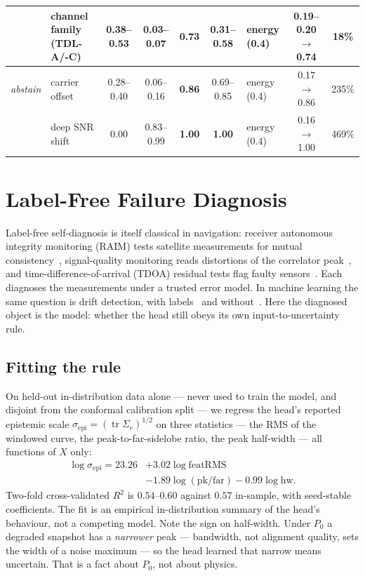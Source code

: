 \documentclass{article}
\begin{document}
\begin{table}[t]
\begin{tabular}{@{}clcccc|lcc@{}}
& channel family (TDL-A/-C)     & 0.38--0.53 & 0.03--0.07 & \textbf{0.73} & 0.31--0.58 & \textbf{energy} (0.4) & 0.19--0.20 $\to$ \textbf{0.74} & 18\% \\
\midrule
{\itshape abstain} & carrier offset                & 0.28--0.40 & 0.06--0.16 & \textbf{0.86} & 0.69--0.85 & energy (0.4) & 0.17 $\to$ 0.86 & 235\% \\
& deep SNR shift                & 0.00 & 0.83--0.99 & \textbf{1.00} & \textbf{1.00} & energy (0.4) & 0.16 $\to$ 1.00 & 469\% \\
\bottomrule
\end{tabular}
\end{table}

\section{Label-Free Failure Diagnosis}
\label{sec:diag}

Label-free self-diagnosis is itself classical in navigation: receiver
autonomous integrity monitoring (RAIM) tests satellite measurements for mutual consistency~\cite{brown1992},
signal-quality monitoring reads distortions of the correlator
peak~\cite{phelts2001}, and time-difference-of-arrival (TDOA) residual tests flag faulty
sensors~\cite{giunta2023}. Each diagnoses the measurements under a trusted
error model. In machine learning the same question is
drift detection, with labels~\cite{bayram2022} and without~\cite{oikarinen2021}. Here the diagnosed object is the model: whether the head
still obeys its own input-to-uncertainty rule.

\subsection{Fitting the rule}
\label{sec:fit}
On held-out in-distribution data alone --- never used to train the model,
and disjoint from the conformal calibration split --- we regress the head's
reported epistemic scale
$\sigma_{\mathrm{epi}}=(\operatorname{tr}\Sigma_e)^{1/2}$ on three statistics --- the RMS of the windowed
curve, the peak-to-far-sidelobe ratio, the peak half-width --- all
functions of $X$ only:
\begin{align}
\log\sigma_{\mathrm{epi}} = 23.26 &+ 3.02\log \mathrm{featRMS} \nonumber\\[-3pt]
 &- 1.89\log \mathrm{(pk/far)} - 0.99\log \mathrm{hw}.
\label{eq:rule}
\end{align}
Two-fold cross-validated $R^2$ is $0.54$--$0.60$ against $0.57$ in-sample,
with seed-stable coefficients. The fit is an empirical in-distribution summary of the head's behaviour,
not a competing model. Note the
sign on half-width. Under $P_0$ a degraded snapshot has a \emph{narrower}
peak --- bandwidth, not alignment quality, sets the width of a noise
maximum --- so the head learned that narrow means uncertain. That is a fact
about $P_0$, not about physics.
\end{document}
